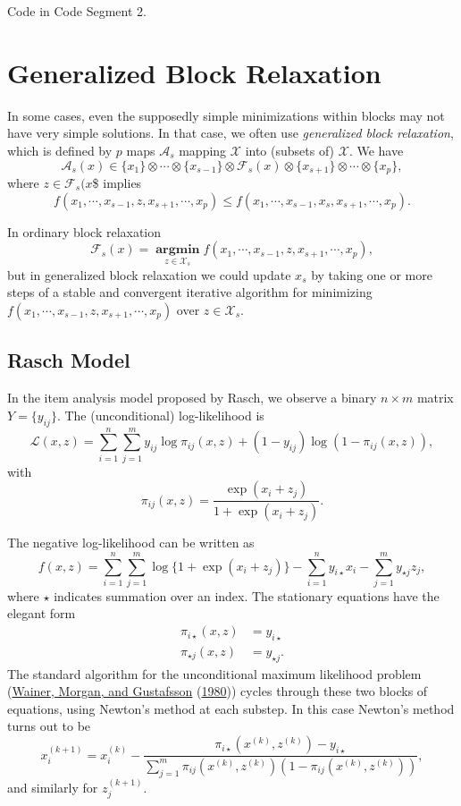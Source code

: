 \documentclass[
  12pt,
]{book}
\begin{document}
Code in Code Segment 2.

\hypertarget{blockrelaxation:generalizedblockrelaxation}{%
\section{Generalized Block Relaxation}\label{blockrelaxation:generalizedblockrelaxation}}

In some cases, even the supposedly simple minimizations within
blocks may not have very simple solutions. In that case, we often
use \emph{generalized block relaxation}, which is defined by \(p\)
maps \(\mathcal{A}_s\)
mapping \(\mathcal{X}\) into (subsets of) \(\mathcal{X}\). We have
\[
\mathcal{A}_s(x)\in\{x_1\}\otimes\cdots\otimes\{x_{s-1}\}\otimes\mathcal{F}_s(x)\otimes\{x_{s+1}\}\otimes\cdots\otimes\{x_p\},
\]
where \(z\in\mathcal{F}_s(x\)\$ implies
\[
f(x_1,\cdots,x_{s-1},z,x_{s+1},\cdots,x_p)\leq f(x_1,\cdots,x_{s-1},x_s,x_{s+1},\cdots,x_p).
\]

In ordinary block relaxation
\[
\mathcal{F}_s(x)=\mathop{\mathbf{argmin}}\limits_{z\in\mathcal{X}_s} f(x_1,\cdots,x_{s-1},z,x_{s+1},\cdots,x_p),
\]
but in generalized block relaxation we could update \(x_s\) by taking one or more steps of a stable and convergent iterative algorithm for minimizing \(f(x_1,\cdots,x_{s-1},z,x_{s+1},\cdots,x_p)\) over \(z\in\mathcal{X}_s\).

\hypertarget{blockrelaxation:generalizedblockrelaxation:raschmodel}{%
\subsection{Rasch Model}\label{blockrelaxation:generalizedblockrelaxation:raschmodel}}

In the item analysis model proposed by Rasch, we observe
a binary \(n\times m\) matrix \(Y=\{y_{ij}\}\). The (unconditional) log-likelihood is
\[
\mathcal{L}(x,z)=\sum_{i=1}^n\sum_{j=1}^m y_{ij}\log\pi_{ij}(x,z)+(1-y_{ij})\log(1-\pi_{ij}(x,z)),
\]
with
\[
\pi_{ij}(x,z)=\frac{\exp(x_i+z_j)}{1+\exp(x_i+z_j)}.
\]

The negative log-likelihood can be written as
\[
f(x,z)=\sum_{i=1}^n\sum_{j=1}^m\log\{1+\exp(x_i+z_j)\}
-\sum_{i=1}^n y_{i\star}x_i-\sum_{j=1}^m y_{\star j}z_j,
\]
where \(\star\) indicates summation over an index. The stationary equations
have the elegant form
\begin{align*}
\pi_{i\star}(x,z)&=y_{i\star}\\
\pi_{\star j}(x,z)&=y_{\star j}.
\end{align*}
The standard algorithm for the unconditional maximum likelihood problem (\protect\hyperlink{ref-wainer_morgan_gustafsson_80}{Wainer, Morgan, and Gustafsson} (\protect\hyperlink{ref-wainer_morgan_gustafsson_80}{1980})) cycles through these two blocks of equations, using Newton's method at each substep.
In this case Newton's method turns out to be
\[
x_i^{(k+1)}=x_i^{(k)}-\frac{\pi_{i\star}(x^{(k)},z^{(k)})-y_{i\star}}
{\sum_{j=1}^m{\pi_{ij}(x^{(k)},z^{(k)})(1-\pi_{ij}(x^{(k)},z^{(k)}))}},
\]
and similarly for \(z_j^{(k+1)}.\)
\end{document}
